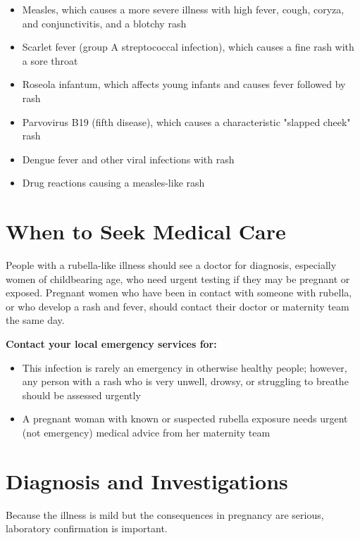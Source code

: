 \begin{itemize}
    \item Measles, which causes a more severe illness with high fever, cough, coryza, and conjunctivitis, and a blotchy rash
    \item Scarlet fever (group A streptococcal infection), which causes a fine rash with a sore throat
    \item Roseola infantum, which affects young infants and causes fever followed by rash
    \item Parvovirus B19 (fifth disease), which causes a characteristic "slapped cheek" rash
    \item Dengue fever and other viral infections with rash
    \item Drug reactions causing a measles-like rash
\end{itemize}

\section*{When to Seek Medical Care}
People with a rubella-like illness should see a doctor for diagnosis, especially women of childbearing age, who need urgent testing if they may be pregnant or exposed. Pregnant women who have been in contact with someone with rubella, or who develop a rash and fever, should contact their doctor or maternity team the same day.

\textbf{Contact your local emergency services for:}
\begin{itemize}
    \item This infection is rarely an emergency in otherwise healthy people; however, any person with a rash who is very unwell, drowsy, or struggling to breathe should be assessed urgently
    \item A pregnant woman with known or suspected rubella exposure needs urgent (not emergency) medical advice from her maternity team
\end{itemize}

\section*{Diagnosis and Investigations}
Because the illness is mild but the consequences in pregnancy are serious, laboratory confirmation is important.

